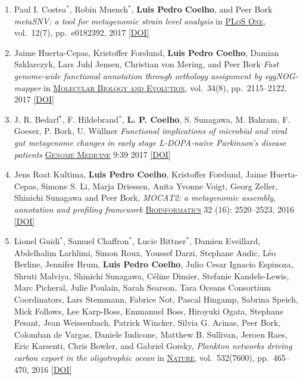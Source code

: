 \documentclass{article}
\newcommand\showdoi[1]{%
    \href{https://doi.org/#1}{[DOI]}%
}
\newcommand\pubname[1]{\textsc{\uline{#1}}}
\newcommand\contribution[1]{\relax}
\newcommand\costar{${}^{*}$}
\begin{document}
\begin{enumerate}[resume]
\item Paul I. Costea\costar, Robin Muench\costar, \textbf{Luis Pedro Coelho},
and Peer Bork \emph{metaSNV: a tool for metagenomic strain level analysis} in
\pubname{PLoS One}, vol.\ 12(7), pp.\ e0182392, 2017
\showdoi{10.1371/journal.pone.0182392}
\contribution{I contributed computer code for the proposed tool, ideas for the
design of the benchmark, and participated in the manuscript preparation.}

\item Jaime Huerta-Cepas, Kristoffer Forslund, \textbf{Luis Pedro Coelho},
Damian Szklarczyk, Lars Juhl Jensen, Christian von Mering, and Peer Bork
\emph{Fast genome-wide functional annotation through orthology assignment by
eggNOG-mapper} in \pubname{Molecular Biology and Evolution}, vol.\ 34(8), pp.\
2115--2122, 2017 \showdoi{10.1093/molbev/msx148}
\contribution{I contributed to the evaluation of the tool, in particular, in
the evaluation of the suitability of the tool to metagenomics data.}

\item J. R. Bedarf\costar, F. Hildebrand\costar, \textbf{L. P. Coelho}, S.
Sunagawa, M. Bahram, F. Goeser, P. Bork, U. Wüllner \emph{Functional
implications of microbial and viral gut metagenome changes in early stage
L-DOPA-naïve Parkinson’s disease patients} \pubname{Genome Medicine} 9:39 2017
\showdoi{10.1186/s13073-017-0428-y}
\contribution{I built machine learning models based on metagenomics data.}

\item Jens Roat Kultima, \textbf{Luis Pedro Coelho}, Kristoffer Forslund, Jaime
Huerta-Cepas, Simone S. Li, Marja Driessen, Anita Yvonne Voigt, Georg Zeller,
Shinichi Sunagawa and Peer Bork, \emph{MOCAT2: a metagenomic assembly,
annotation and profiling framework} \pubname{Bioinformatics} 32 (16):
2520--2523, 2016 \showdoi{10.1093/bioinformatics/btw183}
\contribution{I participated in the design and implementation of the proposed tool.}

\item Lionel Guidi\costar, Samuel Chaffron\costar, Lucie Bittner\costar,
Damien Eveillard, Abdelhalim Larhlimi, Simon Roux, Youssef Darzi, Stephane
Audic, Léo Berline, Jennifer Brum, \textbf{Luis Pedro Coelho}, Julio Cesar
Ignacio Espinoza, Shruti Malviya, Shinichi Sunagawa, Céline Dimier, Stefanie
Kandels-Lewis, Marc Picheral, Julie Poulain, Sarah Searson, Tara Oceans
Consortium Coordinators, Lars Stemmann, Fabrice Not, Pascal Hingamp, Sabrina
Speich, Mick Follows, Lee Karp-Boss, Emmanuel Boss, Hiroyuki Ogata, Stephane
Pesant, Jean Weissenbach, Patrick Wincker, Silvia G. Acinas, Peer Bork,
Colomban de Vargas, Daniele Iudicone, Matthew B. Sullivan, Jeroen Raes, Eric
Karsenti, Chris Bowler, and Gabriel Gorsky, \emph{Plankton networks driving
carbon export in the oligotrophic ocean} in \pubname{Nature}, vol.\ 532(7600),
pp.\ 465--470, 2016 \showdoi{10.1038/nature16942}
\contribution{I performed functional analysis of the metagenomics data.}


\end{enumerate}
\end{document}
